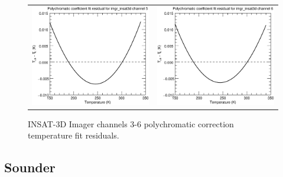 \begin{figure}[H]
\begin{tabular}{c c}
    \includegraphics[scale=0.35]{graphics/imgr/tfit/imgr_insat3d-5.tfit.eps} &
    \includegraphics[scale=0.35]{graphics/imgr/tfit/imgr_insat3d-6.tfit.eps} \\
  \end{tabular}
  \caption{INSAT-3D Imager channels 3-6 polychromatic correction temperature fit residuals.}
  \label{fig:imgr_ch1-6_tfit}
\end{figure}

\subsection{Sounder}

